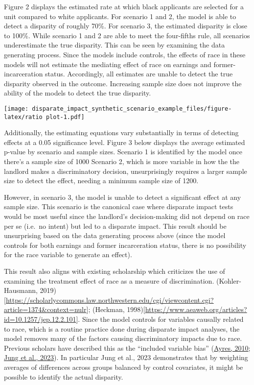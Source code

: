 \documentclass[
]{article}
\begin{document}
Figure 2 displays the estimated rate at which black applicants are
selected for a unit compared to white applicants. For scenario 1 and 2,
the model is able to detect a disparity of roughly 70\%. For scenario 3,
the estimated disparity is close to 100\%. While scenario 1 and 2 are
able to meet the four-fifths rule, all scenarios underestimate the true
disparity. This can be seen by examining the data generating process.
Since the models include controls, the effects of race in these models
will not estimate the mediating effect of race on earnings and
former-incarceration status. Accordingly, all estimates are unable to
detect the true disparity observed in the outcome. Increasing sample
size does not improve the ability of the models to detect the true
disparity.

\texttt{[image: disparate\_impact\_synthetic\_scenario\_example\_files/figure-latex/ratio plot-1.pdf]}

Additionally, the estimating equations vary substantially in terms of
detecting effects at a 0.05 significance level. Figure 3 below displays
the average estimated p-value by scenario and sample sizes. Scenario 1
is identified by the model once there's a sample size of 1000 Scenario
2, which is more variable in how the the landlord makes a discriminatory
decision, unsurprisingly requires a larger sample size to detect the
effect, needing a minimum sample size of 1200.

However, in scenario 3, the model is unable to detect a significant
effect at any sample size. This scenario is the canonical case where
disparate impact tests would be most useful since the landlord's
decision-making did not depend on race per se (i.e.~no intent) but led
to a disparate impact. This result should be unsurprising based on the
data generating process above (since the model controls for both
earnings and former incarceration status, there is no possibility for
the race variable to generate an effect).

This result also aligns with existing scholarship which criticizes the
use of examining the treatment effect of race as a measure of
discrimination. (Kohler-Hausmann,
2019){[}\url{https://scholarlycommons.law.northwestern.edu/cgi/viewcontent.cgi?article=1374\&context=nulr}{]};
(Heckman,
1998){[}\url{https://www.aeaweb.org/articles?id=10.1257/jep.12.2.101}{]}.
Since the model controls for variables causally related to race, which
is a routine practice done during disparate impact analyses, the model
removes many of the factors causing discriminatory impacts due to race.
Previous scholars have described this as the ``included variable bias''
(\href{https://www.law.upenn.edu/live/files/1138-ayresincludedvariablebiaspdf}{Ayres,
2010}; \href{https://5harad.com/papers/included-variable-bias.pdf}{Jung
et al., 2023}). In particular Jung et al., 2023 demonstrates that by
weighting averages of differences across groups balanced by control
covariates, it might be possible to identify the actual disparity.
\end{document}
